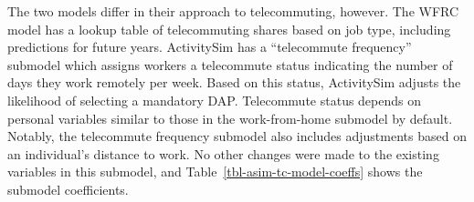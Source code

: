 \documentclass[fancy, oneside, mastersfancy, ms]{byuthesis}
\begin{document}
\begin{table}

\caption{\label{tbl-asim-wfh-model-coeffs}Work-From-Home Submodel Choice
Coefficients in ActivitySim}


\end{table}%

The two models differ in their approach to telecommuting, however. The
WFRC model has a lookup table of telecommuting shares based on job type,
including predictions for future years. ActivitySim has a ``telecommute
frequency'' submodel which assigns workers a telecommute status
indicating the number of days they work remotely per week. Based on this
status, ActivitySim adjusts the likelihood of selecting a mandatory DAP.
Telecommute status depends on personal variables similar to those in the
work-from-home submodel by default. Notably, the telecommute frequency
submodel also includes adjustments based on an individual's distance to
work. No other changes were made to the existing variables in this
submodel, and Table~\ref{tbl-asim-tc-model-coeffs} shows the submodel
coefficients.
\end{document}
